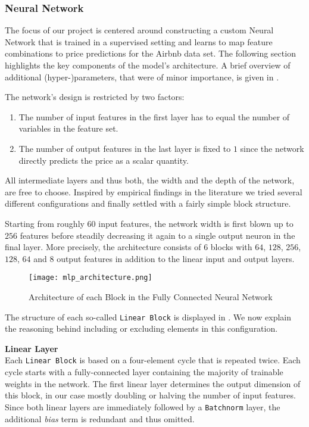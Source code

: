 \subsubsection{Neural Network} \label{neural-network}

The focus of our project is centered around constructing a custom Neural Network that is trained in a supervised setting and learns to map feature combinations to price predictions for the Airbnb data set.
The following section highlights the key components of the model's architecture.
A brief overview of additional (hyper-)parameters, that were of minor importance, is given in .

The network's design is restricted by two factors:
\begin{enumerate}
  \item The number of input features in the first layer has to equal the number of variables in the feature set.
  \item The number of output features in the last layer is fixed to $1$ since the network directly predicts the price as a scalar quantity.
\end{enumerate}
All intermediate layers and thus both, the width and the depth of the network, are free to choose.
Inspired by empirical findings in the literature we tried several different configurations and finally settled with a fairly simple block structure.

Starting from roughly $60$ input features, the network width is first blown up to $256$ features before steadily decreasing it again to a single output neuron in the final layer.
More precisely, the architecture consists of $6$ blocks with $64$, $128$, $256$, $128$, $64$ and $8$ output features in addition to the linear input and output layers.

\begin{figure}[t]
  \centering
  \texttt{[image: mlp\_architecture.png]}
  \caption{Architecture of each Block in the Fully Connected Neural Network}
  \label{fig:linear-block}
\end{figure}

The structure of each so-called \texttt{Linear Block} is displayed in .
We now explain the reasoning behind including or excluding elements in this configuration.

\textbf{Linear Layer} \\
Each \texttt{Linear Block} is based on a four-element cycle that is repeated twice.
Each cycle starts with a fully-connected layer containing the majority of trainable weights in the network.
The first linear layer determines the output dimension of this block, in our case mostly doubling or halving the number of input features.
Since both linear layers are immediately followed by a \texttt{Batchnorm} layer, the additional \emph{bias} term is redundant and thus omitted.

